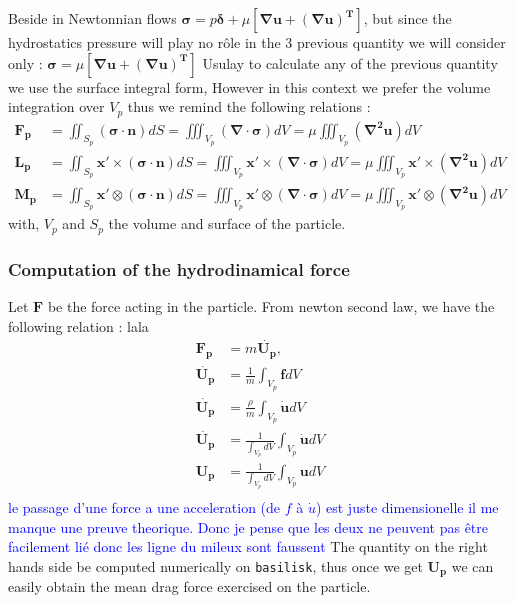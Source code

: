 \documentclass[10pt,a4paper,openany]{article}
\theoremstyle{mytheoremstyle}
\theoremstyle{mytheoremstyle}
\theoremstyle{myproblemstyle}
\begin{document}
Beside in Newtonnian flows $\bm{\sigma} = p\bm{\delta} +\mu\left[\bm{\nabla u + (\nabla u)^T}\right]$, but since the hydrostatics pressure will play no rôle in the 3 previous quantity we will consider only :
$\bm{\sigma} =\mu\left[\bm{\nabla u + (\nabla u)^T}\right]$
Usulay to calculate any of the previous quantity we use the surface integral form, However in this context we prefer the volume integration over $V_p$ thus we remind the following relations :
\begin{align*}
    \bm{F_p} &= \iint_{S_p} \left( \bm{\sigma}\cdot \bm{n}\right)dS = \iiint_{V_p} \left(\bm{\nabla}\cdot \bm{\sigma}\right)dV = \mu \iiint_{V_p} \left(\bm{\nabla^2 u}\right)dV \\
    \bm{L_p} &= \iint_{S_p} \bm{x'}\times\left( \bm{\sigma}\cdot \bm{n}\right)dS = \iiint_{V_p} \bm{x'}\times \left(\bm{\nabla}\cdot \bm{\sigma}\right)dV=\mu \iiint_{V_p} \bm{x'}\times \left(\bm{\nabla^2 u}\right)dV \\
    \bm{M_p} &= \iint_{S_p} \bm{x'}\otimes\left( \bm{\sigma}\cdot \bm{n}\right)dS = \iiint_{V_p} \bm{x'}\otimes\left(\bm{\nabla}\cdot \bm{\sigma}\right)dV= \mu\iiint_{V_p} \bm{x'}\otimes\left(\bm{\nabla^2 u}\right)dV 
\end{align*}
with, $V_p$ and $S_p$ the volume and surface of the particle. 
\subsubsection*{Computation of the hydrodinamical force} 
Let $\bm{F}$ be the force acting in the particle. 
From newton second law, we have the following relation :
lala
\begin{align} 
    \bm{F_p} &= m \bm{\dot{U_p}},\\
    \bm{\dot{U_p}} &= \frac{1}{m}\int_{V_p} \bm{f}dV\\
    \bm{\dot{U_p}} &= \frac{\rho}{m}\int_{V_p} \bm{\dot{u}}dV\\
    \bm{\dot{U_p}} &= \frac{1}{\int_{V_p}dV}\int_{V_p} \bm{\dot{u}}dV\\
    \bm{U_p}       &= \frac{1}{\int_{V_p}dV}\int_{V_p} \bm{u}dV\\
\end{align}
\textcolor{blue}{le passage d'une force a une acceleration (de $f$ à $\dot{u}$) est juste dimensionelle il me manque une preuve theorique. Donc je pense que les deux ne peuvent pas être facilement lié donc les ligne du mileux sont faussent}
The quantity on the right hands side be computed numerically on \texttt{basilisk}, thus once we get $\bm{U_p}$ we can easily obtain the mean drag force exercised on the particle.  
\end{document}
